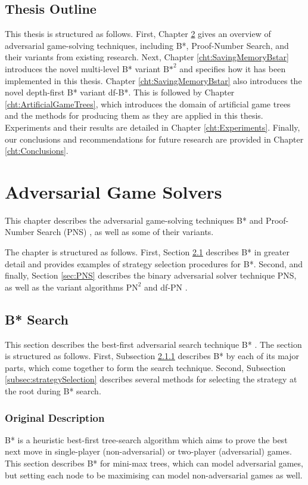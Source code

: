\section{Thesis Outline}
\label{sec:outline}
This thesis is structured as follows. First, Chapter \ref{cht:GameSolvers} gives an overview of adversarial game-solving techniques, including B*, Proof-Number Search, and their variants from existing research. Next, Chapter \ref{cht:SavingMemoryBstar} introduces the novel multi-level B* variant ${\text{B*}}^2$ and specifies how it has been implemented in this thesis. Chapter \ref{cht:SavingMemoryBstar} also introduces the novel depth-first B* variant df-B*. This is followed by Chapter \ref{cht:ArtificialGameTrees}, which introduces the domain of artificial game trees and the methods for producing them as they are applied in this thesis. Experiments and their results are detailed in Chapter \ref{cht:Experiments}. Finally, our conclusions and recommendations for future research are provided in Chapter \ref{cht:Conclusions}.

\chapter{Adversarial Game Solvers}
\label{cht:GameSolvers}
This chapter describes the adversarial game-solving techniques B* \cite{Berliner1979} and Proof-Number Search (PNS) \cite{Allis1994}, as well as some of their variants.

The chapter is structured as follows. First, Section \ref{sec:Bstar} describes B* in greater detail and provides examples of strategy selection procedures for B*. Second, and finally, Section \ref{sec:PNS} describes the binary adversarial solver technique PNS, as well as the variant algorithms $\text{PN}^2$ \cite{Breuker1998} and df-PN \cite{Nagai2002}.

\section{B* Search}
\label{sec:Bstar}
This section describes the best-first adversarial search technique B* \cite{Berliner1979}. The section is structured as follows. First, Subsection \ref{subsec:BstarDescription} describes B* by each of its major parts, which come together to form the search technique. Second, Subsection \ref{subsec:strategySelection} describes several methods for selecting the strategy at the root during B* search.

\subsection{Original Description}
\label{subsec:BstarDescription}
B* \cite{Berliner1979} is a heuristic best-first tree-search algorithm which aims to prove the best next move in single-player (non-adversarial) or two-player (adversarial) games. This section describes B* for mini-max trees, which can model adversarial games, but setting each node to be maximising can model non-adversarial games as well.

